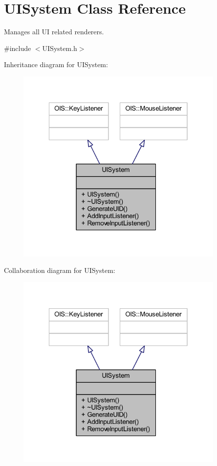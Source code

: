 \hypertarget{class_u_i_system}{\section{U\-I\-System Class Reference}
\label{class_u_i_system}
}


Manages all U\-I related renderers.  




{\ttfamily \#include $<$U\-I\-System.\-h$>$}



Inheritance diagram for U\-I\-System\-:\nopagebreak
\begin{figure}[H]
\begin{center}
\leavevmode
\includegraphics[width=291pt]{class_u_i_system__inherit__graph}
\end{center}
\end{figure}


Collaboration diagram for U\-I\-System\-:\nopagebreak
\begin{figure}[H]
\begin{center}
\leavevmode
\includegraphics[width=291pt]{class_u_i_system__coll__graph}
\end{center}
\end{figure}
